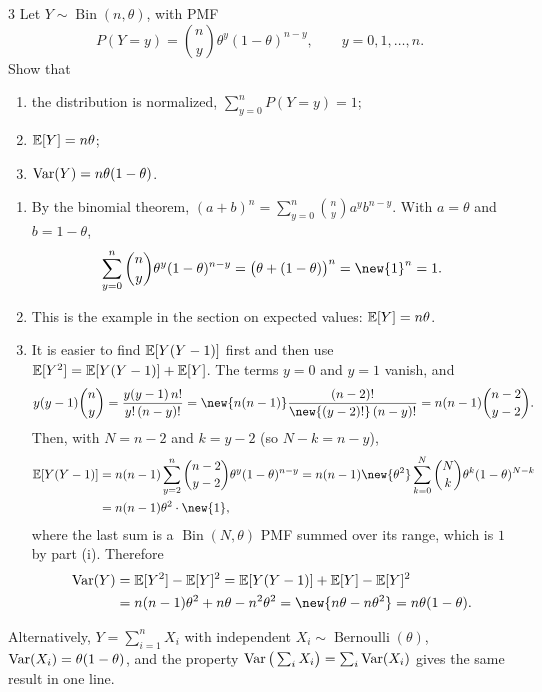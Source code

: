 \begin{homework}{3}
Let $Y \sim \operatorname{Bin}(n, \theta)$, with PMF
\[
P(Y = y) = \binom{n}{y}\theta^{y}(1-\theta)^{n-y}, \qquad y = 0, 1, \dots, n.
\]
Show that
\begin{enumerate}[label=(\roman*)]
\item the distribution is normalized, $\sum_{y=0}^{n} P(Y = y) = 1$;
\item $\mathbb{E}[Y] = n\theta$;
\item $\operatorname{Var}(Y) = n\theta(1-\theta)$.
\end{enumerate}

\soln
\begin{enumerate}[label=(\roman*)]
\item By the binomial theorem, $(a + b)^n = \sum_{y=0}^{n}\binom{n}{y}a^{y}b^{n-y}$. With $a = \theta$ and $b = 1 - \theta$,
\[
\sum_{y=0}^{n}\binom{n}{y}\theta^{y}(1-\theta)^{n-y} = \big(\theta + (1 - \theta)\big)^{n} = \new{1}^{n} = 1.
\]
\item This is the example in the section on expected values: $\mathbb{E}[Y] = n\theta$.
\item It is easier to find $\mathbb{E}[Y(Y-1)]$ first and then use $\mathbb{E}[Y^2] = \mathbb{E}[Y(Y-1)] + \mathbb{E}[Y]$. The terms $y = 0$ and $y = 1$ vanish, and
\[
y(y-1)\binom{n}{y} = \frac{y(y-1)\,n!}{y!\,(n-y)!} = \new{n(n-1)}\frac{(n-2)!}{\new{(y-2)!}\,(n-y)!} = n(n-1)\binom{n-2}{y-2}.
\]
Then, with $N = n - 2$ and $k = y - 2$ (so $N - k = n - y$),
\begin{align*}
\E[Y(Y-1)] &= n(n-1)\sum_{y=2}^{n}\binom{n-2}{y-2}\theta^{y}(1-\theta)^{n-y}
= n(n-1)\new{\theta^2}\sum_{k=0}^{N}\binom{N}{k}\theta^{k}(1-\theta)^{N-k}\\
&= n(n-1)\theta^2 \cdot \new{1},
\end{align*}
where the last sum is a $\operatorname{Bin}(N, \theta)$ PMF summed over its range, which is $1$ by part (i). Therefore
\begin{align*}
\Var(Y) &= \E[Y^2] - \E[Y]^2 = \E[Y(Y-1)] + \E[Y] - \E[Y]^2\\
&= n(n-1)\theta^2 + n\theta - n^2\theta^2 = \new{n\theta - n\theta^2} = n\theta(1 - \theta).
\end{align*}
\end{enumerate}
Alternatively, $Y = \sum_{i=1}^{n} X_i$ with independent $X_i \sim \operatorname{Bernoulli}(\theta)$, $\operatorname{Var}(X_i) = \theta(1-\theta)$, and the property $\operatorname{Var}\big(\sum_i X_i\big) = \sum_i \operatorname{Var}(X_i)$ gives the same result in one line.
\end{homework}

